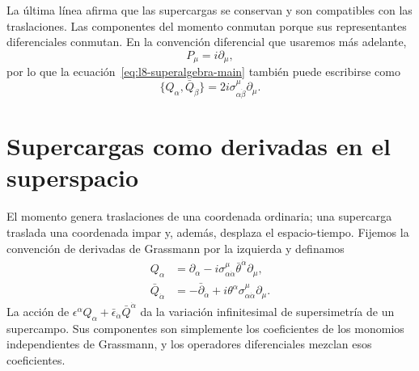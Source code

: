 La última línea afirma que las supercargas se conservan y son compatibles con las traslaciones. Las componentes del momento conmutan porque sus representantes diferenciales conmutan. En la convención diferencial que usaremos más adelante,
\begin{equation}
P_\mu=i\partial_\mu,
\end{equation}
por lo que la ecuación~\eqref{eq:l8-superalgebra-main} también puede escribirse como
\begin{equation}
\{Q_\alpha,\bar Q_{\dot\beta}\}
=2i\sigma^\mu_{\alpha\dot\beta}\partial_\mu.
\end{equation}

\section{Supercargas como derivadas en el superspacio}

El momento genera traslaciones de una coordenada ordinaria; una supercarga traslada una coordenada impar y, además, desplaza el espacio-tiempo. Fijemos la convención de derivadas de Grassmann por la izquierda y definamos
\begin{align}
Q_\alpha
&=\partial_\alpha
-i\sigma^\mu_{\alpha\dot\alpha}
\bar\theta^{\dot\alpha}\partial_\mu,
\label{eq:l8-Q}\\
\bar Q_{\dot\alpha}
&=-\bar\partial_{\dot\alpha}
+i\theta^\alpha\sigma^\mu_{\alpha\dot\alpha}\partial_\mu.
\label{eq:l8-Qbar}
\end{align}
La acción de \(\epsilon^\alpha Q_\alpha+
\bar\epsilon_{\dot\alpha}\bar Q^{\dot\alpha}\) da la variación infinitesimal de supersimetría de un supercampo. Sus componentes son simplemente los coeficientes de los monomios independientes de Grassmann, y los operadores diferenciales mezclan esos coeficientes.

\begin{classroomqa}
\end{classroomqa}

\begin{classroomqa}
\end{classroomqa}

